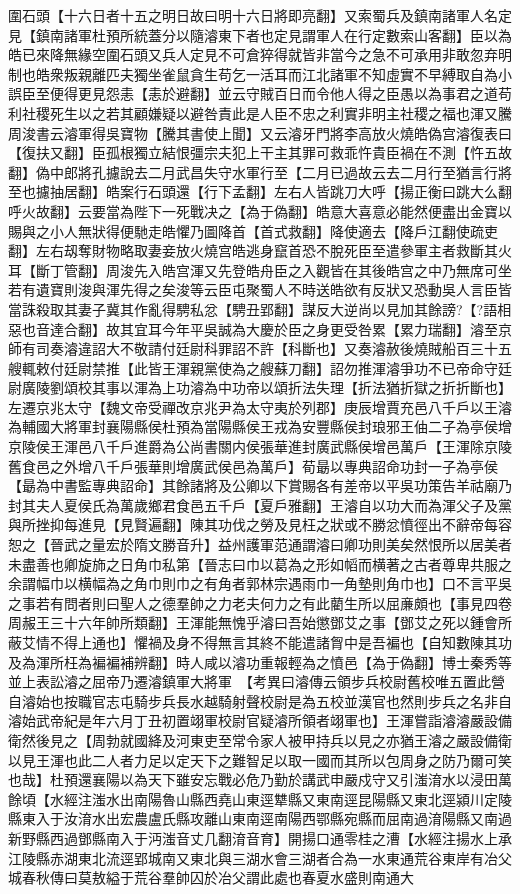 圍石頭【十六日者十五之明日故曰明十六日將即亮翻】又索蜀兵及鎮南諸軍人名定見【鎮南諸軍杜預所統蓋分以隨濬東下者也定見謂軍人在行定數索山客翻】臣以為皓已來降無緣空圍石頭又兵人定見不可倉猝得就皆非當今之急不可承用非敢忽弃明制也皓衆叛親離匹夫獨坐雀鼠貪生苟乞一活耳而江北諸軍不知虛實不早縛取自為小誤臣至便得更見怨恚【恚於避翻】並云守賊百日而令他人得之臣愚以為事君之道苟利社稷死生以之若其顧嫌疑以避咎責此是人臣不忠之利實非明主社稷之福也渾又騰周浚書云濬軍得吳寶物【騰其書使上聞】又云濬牙門將李高放火燒皓偽宫濬復表曰【復扶又翻】臣孤根獨立結恨彊宗夫犯上干主其罪可救乖忤貴臣禍在不測【忤五故翻】偽中郎將孔攄說去二月武昌失守水軍行至【二月已過故云去二月行至猶言行將至也攄抽居翻】皓案行石頭還【行下孟翻】左右人皆跳刀大呼【揚正衡曰跳大么翻呼火故翻】云要當為陛下一死戰决之【為于偽翻】皓意大喜意必能然便盡出金寶以賜與之小人無狀得便馳走皓懼乃圖降首【首式救翻】降使適去【降戶江翻使疏吏翻】左右刼奪財物略取妻妾放火燒宫皓逃身竄首恐不脫死臣至遣參軍主者救斷其火耳【斷丁管翻】周浚先入皓宫渾又先登皓舟臣之入觀皆在其後皓宫之中乃無席可坐若有遺寶則浚與渾先得之矣浚等云臣屯聚蜀人不時送皓欲有反狀又恐動吳人言臣皆當誅殺取其妻子冀其作亂得騁私忿【騁丑郢翻】謀反大逆尚以見加其餘謗?【?語相惡也音達合翻】故其宜耳今年平吳誠為大慶於臣之身更受咎累【累力瑞翻】濬至京師有司奏濬違詔大不敬請付廷尉科罪詔不許【科斷也】又奏濬赦後燒賊船百三十五艘輒敕付廷尉禁推【此皆王渾親黨使為之艘蘇刀翻】詔勿推渾濬爭功不已帝命守廷尉廣陵劉頌校其事以渾為上功濬為中功帝以頌折法失理【折法猶折獄之折折斷也】左遷京兆太守【魏文帝受禪改京兆尹為太守夷於列郡】庚辰增賈充邑八千戶以王濬為輔國大將軍封襄陽縣侯杜預為當陽縣侯王戎為安豐縣侯封琅邪王伷二子為亭侯增京陵侯王渾邑八千戶進爵為公尚書關内侯張華進封廣武縣侯增邑萬戶【王渾除京陵舊食邑之外增八千戶張華則增廣武侯邑為萬戶】荀朂以專典詔命功封一子為亭侯【朂為中書監專典詔命】其餘諸將及公卿以下賞賜各有差帝以平吳功策告羊祜廟乃封其夫人夏侯氏為萬歲鄉君食邑五千戶【夏戶雅翻】王濬自以功大而為渾父子及黨與所挫抑每進見【見賢遍翻】陳其功伐之勞及見枉之狀或不勝忿憤徑出不辭帝每容恕之【晉武之量宏於隋文勝音升】益州護軍范通謂濬曰卿功則美矣然恨所以居美者未盡善也卿旋斾之日角巾私第【晉志曰巾以葛為之形如幍而横著之古者尊卑共服之余謂幅巾以横幅為之角巾則巾之有角者郭林宗遇雨巾一角墊則角巾也】口不言平吳之事若有問者則曰聖人之德羣帥之力老夫何力之有此藺生所以屈亷頗也【事見四卷周赧王三十六年帥所類翻】王渾能無愧乎濬曰吾始懲鄧艾之事【鄧艾之死以鍾會所蔽艾情不得上通也】懼禍及身不得無言其終不能遣諸胷中是吾褊也【自知數陳其功及為渾所枉為褊褊補辨翻】時人咸以濬功重報輕為之憤邑【為于偽翻】博士秦秀等並上表訟濬之屈帝乃遷濬鎮軍大將軍　【考異曰濬傳云領步兵校尉舊校唯五置此營自濬始也按職官志屯騎步兵長水越騎射聲校尉是為五校並漢官也然則步兵之名非自濬始武帝紀是年六月丁丑初置翊軍校尉官疑濬所領者翊軍也】王渾嘗詣濬濬嚴設備衛然後見之【周勃就國絳及河東吏至常令家人被甲持兵以見之亦猶王濬之嚴設備衛以見王渾也此二人者力足以定天下之難智足以取一國而其所以包周身之防乃爾可笑也哉】杜預還襄陽以為天下雖安忘戰必危乃勤於講武申嚴戍守又引滍淯水以浸田萬餘頃【水經注滍水出南陽魯山縣西堯山東逕犨縣又東南逕昆陽縣又東北逕潁川定陵縣東入于汝淯水出宏農盧氏縣攻離山東南逕南陽西鄂縣宛縣而屈南過淯陽縣又南過新野縣西過鄧縣南入于沔滍音丈几翻淯音育】開揚口通零桂之漕【水經注揚水上承江陵縣赤湖東北流逕郢城南又東北與三湖水會三湖者合為一水東通荒谷東岸有冶父城春秋傳曰莫敖縊于荒谷羣帥囚於冶父謂此處也春夏水盛則南通大